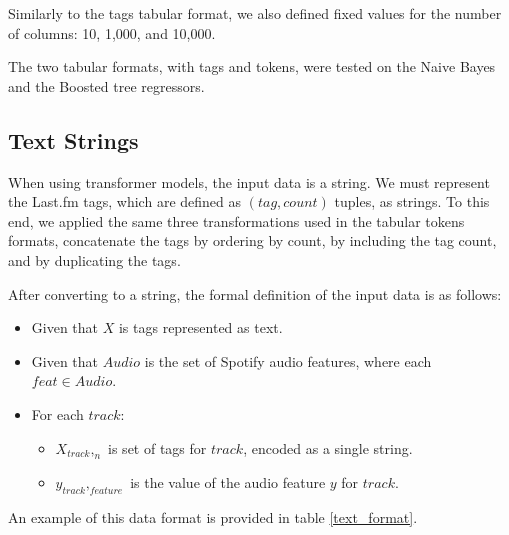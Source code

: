 \documentclass[sn-mathphys]{sn-jnl}%
\theoremstyle{thmstyleone}%
\theoremstyle{thmstyletwo}%
\theoremstyle{thmstylethree}%
\begin{document}
Similarly to the tags tabular format, we also defined fixed values for the number of columns: 10, 1,000, and 10,000.

The two tabular formats, with tags and tokens, were tested on the Naive Bayes and the Boosted tree regressors.


\subsection{Text Strings}

When using transformer models, the input data is a string.
We must represent the Last.fm tags, which are defined as $(tag, count)$ tuples, as strings.
To this end, we applied the same three transformations used in the tabular tokens formats,
concatenate the tags by ordering by count, by including the tag count, and by duplicating the tags.

After converting to a string, the formal definition of the input data is as follows:

\begin{itemize}
      \item Given that $X$ is tags represented as text.
      \item Given that $Audio$ is the set of Spotify audio features, where each $feat \in Audio$.
      \item For each $track$:
      \begin{itemize}
            \item $X_{track},_{n}$ is set of tags for $track$, encoded as a single string.
            \item $y_{track},_{feature}$ is the value of the audio feature $y$ for $track$.
      \end{itemize}
\end{itemize}

An example of this data format is provided in table \ref{text_format}.
\end{document}
